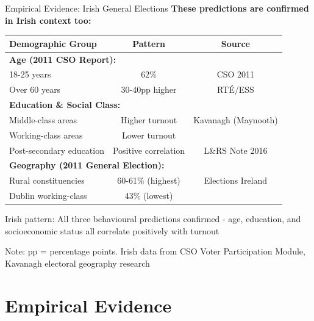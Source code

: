 \documentclass[10pt]{beamer}
\begin{document}
\begin{frame}{Empirical Evidence: Irish General Elections}
\textbf{These predictions are confirmed in Irish context too:}

\begin{table}
\centering
\footnotesize
\begin{tabular}{lcc}
\toprule
\textbf{Demographic Group} & \textbf{Pattern} & \textbf{Source} \\
\midrule
\multicolumn{3}{l}{\textbf{Age (2011 CSO Report):}} \\
18-25 years & 62\% & CSO 2011 \\
Over 60 years & 30-40pp higher & RTÉ/ESS \\
\midrule
\multicolumn{3}{l}{\textbf{Education \& Social Class:}} \\
Middle-class areas & Higher turnout & Kavanagh (Maynooth) \\
Working-class areas & Lower turnout & \\
Post-secondary education & Positive correlation & L\&RS Note 2016 \\
\midrule
\multicolumn{3}{l}{\textbf{Geography (2011 General Election):}} \\
Rural constituencies & 60-61\% (highest) & Elections Ireland \\
Dublin working-class & 43\% (lowest) & \\
\bottomrule
\end{tabular}
\end{table}


\alert{Irish pattern:} All three behavioural predictions confirmed - age, education, and socioeconomic status all correlate positively with turnout


\footnotesize{Note: pp = percentage points. Irish data from CSO Voter Participation Module, Kavanagh electoral geography research}
\end{frame}

\section{Empirical Evidence}
\end{document}
